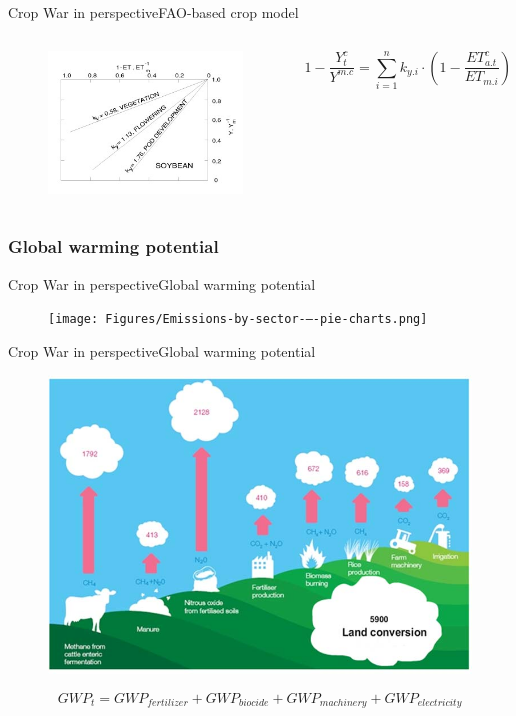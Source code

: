 \documentclass[10pt, aspectratio=169]{beamer}
\def\ba{Crop War in perspective}
\def\baa{FAO-based crop model}
\def\bab{Global warming potential}
\begin{document}
\begin{frame}{\ba}{\baa}
  \begin{columns}
  \begin{figure}
    \centering
    \includegraphics[width=\textwidth]{Figures/Y3655E01.jpeg}
  \end{figure}
  \begin{equation}
    1-\frac{Y_t^c}{Y^{m.c}}=\sum_{i=1}^{n} k_{y.i} \cdot(1-\frac{ET_{a.t}^c}{ET_{m.i}}) 
  \end{equation}
\end{columns} 
\end{frame}

\subsubsection{\bab}

\begin{frame}{\ba}{\bab}
  \begin{figure}
    \centering
    \texttt{[image: Figures/Emissions-by-sector-–-pie-charts.png]}
  \end{figure} 
\end{frame}


\begin{frame}{\ba}{\bab}
  \begin{figure}
    \centering
    \includegraphics[width=.6\textwidth]{Figures/GHG-emissions-from-agricultural-sector-by-practices-in-Mt-CO2-e}
  \end{figure}
  \begin{equation}
    GWP_{t}=GWP_{fertilizer}+GWP_{biocide}+GWP_{machinery}+GWP_{electricity}  
    \end{equation}
\end{frame}
 
\end{document}
